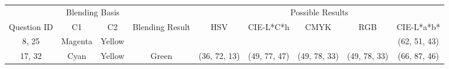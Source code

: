 \begin{table}[htbp]
  \resizebox{\textwidth}{!} {
  \begin{tabular}{ccccclclclclcl}
    \hline
                                  & \multicolumn{2}{c}{Blending Basis}                          &                                                                          & \multicolumn{10}{c}{Possible Results}                                                                                                                                                                                                                                                                                                                                                                 \\ \cline{2-3} \cline{5-14}
    \multirow{-2}{*}{Question ID} & C1                           & C2                           & \multirow{-2}{*}{Blending Result}                                        & \multicolumn{2}{c}{HSV}                                                         & \multicolumn{2}{c}{CIE-L*C*h}                                                    & \multicolumn{2}{c}{CMYK}                                                         & \multicolumn{2}{c}{RGB}                                                          & \multicolumn{2}{c}{CIE-L*a*b*}                             \\ \hline
    \multicolumn{1}{c|}{8, 25}    & \multicolumn{1}{c|}{Magenta} & \multicolumn{1}{c||}{Yellow}  & \multicolumn{1}{c||}{\cellcolor[HTML]{FF0000}{\color[HTML]{FFFFFF} Red}}  & \multicolumn{2}{c||}{\cellcolor[HTML]{FF0000}{\color[HTML]{FFFFFF} (41, 21, 2)}} & \multicolumn{2}{c||}{\cellcolor[HTML]{FF6755}{\color[HTML]{FFFFFF} (48, 32, 12)}} & \multicolumn{2}{c||}{\cellcolor[HTML]{FF8080}{\color[HTML]{FFFFFF} (53, 38, 25)}} & \multicolumn{2}{c||}{\cellcolor[HTML]{FF8080}{\color[HTML]{FFFFFF} (53, 38, 25)}} & \multicolumn{2}{c|}{\cellcolor[HTML]{FFA6A6}(62, 51, 43)}  \\ \hline \hline
    \multicolumn{1}{c|}{17, 32}   & \multicolumn{1}{c|}{Cyan}    & \multicolumn{1}{c||}{Yellow}  & \multicolumn{1}{c||}{\cellcolor[HTML]{00FF00}Green}                       & \multicolumn{2}{c||}{\cellcolor[HTML]{00FF00}(36, 72, 13)}                       & \multicolumn{2}{c||}{\cellcolor[HTML]{6EFFA3}(49, 77, 47)}                        & \multicolumn{2}{c||}{\cellcolor[HTML]{80FF80}(49, 78, 33)}                        & \multicolumn{2}{c||}{\cellcolor[HTML]{80FF80}(49, 78, 33)}                        & \multicolumn{2}{c|}{\cellcolor[HTML]{C4FF9E}(66, 87, 46)}  \\ \hline \hline

\end{tabular}}
\end{table}
